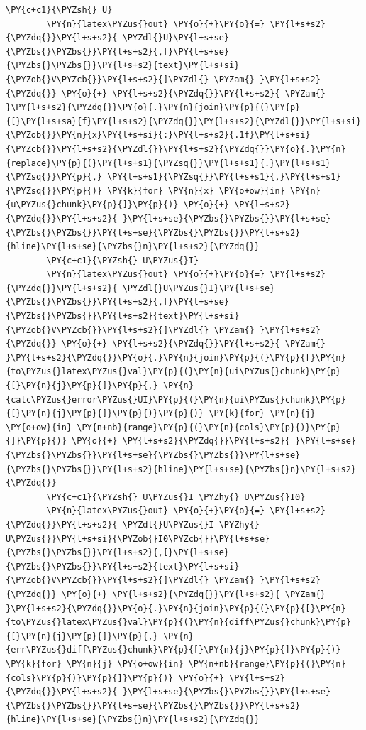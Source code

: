 \begin{tcolorbox}[breakable, size=fbox, boxrule=1pt, pad at break*=1mm,colback=cellbackground, colframe=cellborder]
\begin{Verbatim}[commandchars=\\\{\}]
        \PY{c+c1}{\PYZsh{} U}
        \PY{n}{latex\PYZus{}out} \PY{o}{+}\PY{o}{=} \PY{l+s+s2}{\PYZdq{}}\PY{l+s+s2}{ \PYZdl{}U}\PY{l+s+se}{\PYZbs{}\PYZbs{}}\PY{l+s+s2}{,[}\PY{l+s+se}{\PYZbs{}\PYZbs{}}\PY{l+s+s2}{text}\PY{l+s+si}{\PYZob{}V\PYZcb{}}\PY{l+s+s2}{]\PYZdl{} \PYZam{} }\PY{l+s+s2}{\PYZdq{}} \PY{o}{+} \PY{l+s+s2}{\PYZdq{}}\PY{l+s+s2}{ \PYZam{} }\PY{l+s+s2}{\PYZdq{}}\PY{o}{.}\PY{n}{join}\PY{p}{(}\PY{p}{[}\PY{l+s+sa}{f}\PY{l+s+s2}{\PYZdq{}}\PY{l+s+s2}{\PYZdl{}}\PY{l+s+si}{\PYZob{}}\PY{n}{x}\PY{l+s+si}{:}\PY{l+s+s2}{.1f}\PY{l+s+si}{\PYZcb{}}\PY{l+s+s2}{\PYZdl{}}\PY{l+s+s2}{\PYZdq{}}\PY{o}{.}\PY{n}{replace}\PY{p}{(}\PY{l+s+s1}{\PYZsq{}}\PY{l+s+s1}{.}\PY{l+s+s1}{\PYZsq{}}\PY{p}{,} \PY{l+s+s1}{\PYZsq{}}\PY{l+s+s1}{,}\PY{l+s+s1}{\PYZsq{}}\PY{p}{)} \PY{k}{for} \PY{n}{x} \PY{o+ow}{in} \PY{n}{u\PYZus{}chunk}\PY{p}{]}\PY{p}{)} \PY{o}{+} \PY{l+s+s2}{\PYZdq{}}\PY{l+s+s2}{ }\PY{l+s+se}{\PYZbs{}\PYZbs{}}\PY{l+s+se}{\PYZbs{}\PYZbs{}}\PY{l+s+se}{\PYZbs{}\PYZbs{}}\PY{l+s+s2}{hline}\PY{l+s+se}{\PYZbs{}n}\PY{l+s+s2}{\PYZdq{}}
        \PY{c+c1}{\PYZsh{} U\PYZus{}I}
        \PY{n}{latex\PYZus{}out} \PY{o}{+}\PY{o}{=} \PY{l+s+s2}{\PYZdq{}}\PY{l+s+s2}{ \PYZdl{}U\PYZus{}I}\PY{l+s+se}{\PYZbs{}\PYZbs{}}\PY{l+s+s2}{,[}\PY{l+s+se}{\PYZbs{}\PYZbs{}}\PY{l+s+s2}{text}\PY{l+s+si}{\PYZob{}V\PYZcb{}}\PY{l+s+s2}{]\PYZdl{} \PYZam{} }\PY{l+s+s2}{\PYZdq{}} \PY{o}{+} \PY{l+s+s2}{\PYZdq{}}\PY{l+s+s2}{ \PYZam{} }\PY{l+s+s2}{\PYZdq{}}\PY{o}{.}\PY{n}{join}\PY{p}{(}\PY{p}{[}\PY{n}{to\PYZus{}latex\PYZus{}val}\PY{p}{(}\PY{n}{ui\PYZus{}chunk}\PY{p}{[}\PY{n}{j}\PY{p}{]}\PY{p}{,} \PY{n}{calc\PYZus{}error\PYZus{}UI}\PY{p}{(}\PY{n}{ui\PYZus{}chunk}\PY{p}{[}\PY{n}{j}\PY{p}{]}\PY{p}{)}\PY{p}{)} \PY{k}{for} \PY{n}{j} \PY{o+ow}{in} \PY{n+nb}{range}\PY{p}{(}\PY{n}{cols}\PY{p}{)}\PY{p}{]}\PY{p}{)} \PY{o}{+} \PY{l+s+s2}{\PYZdq{}}\PY{l+s+s2}{ }\PY{l+s+se}{\PYZbs{}\PYZbs{}}\PY{l+s+se}{\PYZbs{}\PYZbs{}}\PY{l+s+se}{\PYZbs{}\PYZbs{}}\PY{l+s+s2}{hline}\PY{l+s+se}{\PYZbs{}n}\PY{l+s+s2}{\PYZdq{}}
        \PY{c+c1}{\PYZsh{} U\PYZus{}I \PYZhy{} U\PYZus{}I0}
        \PY{n}{latex\PYZus{}out} \PY{o}{+}\PY{o}{=} \PY{l+s+s2}{\PYZdq{}}\PY{l+s+s2}{ \PYZdl{}U\PYZus{}I \PYZhy{} U\PYZus{}}\PY{l+s+si}{\PYZob{}I0\PYZcb{}}\PY{l+s+se}{\PYZbs{}\PYZbs{}}\PY{l+s+s2}{,[}\PY{l+s+se}{\PYZbs{}\PYZbs{}}\PY{l+s+s2}{text}\PY{l+s+si}{\PYZob{}V\PYZcb{}}\PY{l+s+s2}{]\PYZdl{} \PYZam{} }\PY{l+s+s2}{\PYZdq{}} \PY{o}{+} \PY{l+s+s2}{\PYZdq{}}\PY{l+s+s2}{ \PYZam{} }\PY{l+s+s2}{\PYZdq{}}\PY{o}{.}\PY{n}{join}\PY{p}{(}\PY{p}{[}\PY{n}{to\PYZus{}latex\PYZus{}val}\PY{p}{(}\PY{n}{diff\PYZus{}chunk}\PY{p}{[}\PY{n}{j}\PY{p}{]}\PY{p}{,} \PY{n}{err\PYZus{}diff\PYZus{}chunk}\PY{p}{[}\PY{n}{j}\PY{p}{]}\PY{p}{)} \PY{k}{for} \PY{n}{j} \PY{o+ow}{in} \PY{n+nb}{range}\PY{p}{(}\PY{n}{cols}\PY{p}{)}\PY{p}{]}\PY{p}{)} \PY{o}{+} \PY{l+s+s2}{\PYZdq{}}\PY{l+s+s2}{ }\PY{l+s+se}{\PYZbs{}\PYZbs{}}\PY{l+s+se}{\PYZbs{}\PYZbs{}}\PY{l+s+se}{\PYZbs{}\PYZbs{}}\PY{l+s+s2}{hline}\PY{l+s+se}{\PYZbs{}n}\PY{l+s+s2}{\PYZdq{}}

\end{Verbatim}
\end{tcolorbox}
